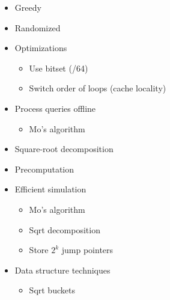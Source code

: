 \documentclass[9pt,a4paper,twocolumn,landscape,oneside]{amsart}
\newenvironment{myitemize}
{ \begin{itemize}[leftmargin=.5cm]
    \setlength{\itemsep}{0pt}
    \setlength{\parskip}{0pt}
    \setlength{\parsep}{0pt}     }
{ \end{itemize}                  }
\begin{document}
\begin{multicols*}{3}
\begin{myitemize}
\begin{itemize}
\begin{itemize}
\begin{itemize}
                                        \item $\mathrm{dp}[i][j] = \min_{i<k<j}\{\mathrm{dp}[i][k] + \mathrm{dp}[k][j] + C[i][j]\}$
                                        \item $A[i][j-1] \leq A[i][j] \leq A[i+1][j]$
                                        \item $O(n^3)$ to $O(n^2)$
                                        \item sufficient: QI and $C[b][c] \leq C[a][d]$, $a\leq b\leq c\leq d$
                                    \end{itemize}
                            \end{itemize}
                    \end{itemize}
                \item Greedy
                \item Randomized
                \item Optimizations
                    \begin{itemize}
                        \item Use bitset (/64)
                        \item Switch order of loops (cache locality)
                    \end{itemize}
                \item Process queries offline
                    \begin{itemize}
                        \item Mo's algorithm
                    \end{itemize}
                \item Square-root decomposition
                \item Precomputation
                \item Efficient simulation
                    \begin{itemize}
                        \item Mo's algorithm
                        \item Sqrt decomposition
                        \item Store $2^k$ jump pointers
                    \end{itemize}
                \item Data structure techniques
                    \begin{itemize}
                        \item Sqrt buckets

\end{itemize}
\end{myitemize}
\end{multicols*}
\end{document}
